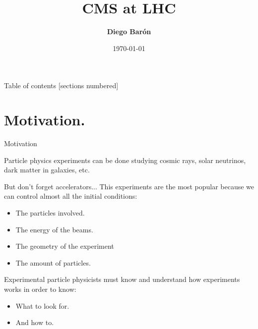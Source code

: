 \documentclass[8pt]{beamer}
\title{\textbf{\huge{CMS at LHC}}}
\date{\today}
\author{\textbf{Diego Barón}}
\institute{Universidad de Antioquia, Instutito de Física.}
\begin{document}
\maketitle

\begin{frame}{Table of contents}
  [sections numbered]
  \tableofcontents[hideallsubsections]
\end{frame}


\section{Motivation.}

\begin{frame}[fragile]{Motivation}

Particle physics experiments can be done studying cosmic rays, solar neutrinos, dark matter in galaxies, etc. 

\begin{exampleblock}{But don't forget accelerators... }
This experiments are the most popular because we can control almost all the initial conditions:
\begin{itemize}
\item The particles involved.
\item The energy of the beams.
\item The geometry of the experiment
\item The amount of particles. 
\end{itemize}    
\end{exampleblock}

Experimental particle physicists must know and understand how experiments works in order to know:
\begin{itemize}
\item What to look for.
\item And how to.
\end{itemize}

\end{frame}
\end{document}

